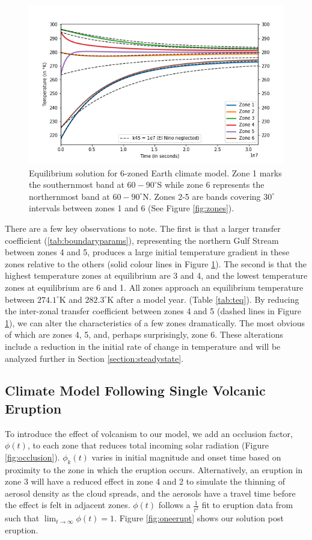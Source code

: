 \documentclass[12pt]{article}
\begin{document}
\begin{figure}[H]
    \centering
    \includegraphics[scale=0.5]{Question2.png}
    \caption{
        Equilibrium solution for 6-zoned Earth climate model. Zone 1 marks the
        southernmost band at $60-90^{\circ}$S while zone 6 represents the
        northernmost band at $60-90^{\circ}$N. Zones 2-5 are bands covering
        $30^{\circ}$ intervals between zones 1 and 6
        (See Figure \ref{fig:zones}).
    }
    \label{fig:steadystate}
\end{figure}
\FloatBarrier

There are a few key observations to note. The first is that a larger transfer
coefficient (\ref{tab:boundaryparams}), representing the northern Gulf Stream
between zones 4 and 5, produces a large initial temperature gradient in these
zones relative to the others (solid colour lines in Figure
\ref{fig:steadystate}). The second is that the highest temperature zones at
equilibrium are 3 and 4, and the lowest temperature zones at equilibrium are 6
and 1. All zones approach an equilibrium temperature between $274.1^{\circ}$K
and $282.3^{\circ}$K after a model year. (Table \ref{tab:teq}). By reducing the
inter-zonal transfer coefficient between zones 4 and 5
(dashed lines in Figure \ref{fig:steadystate}), we can alter the characteristics
of a few zones dramatically. The most obvious of which are zones 4, 5, and,
perhaps surprisingly, zone 6. These alterations include a reduction in the
initial rate of change in temperature and will be analyzed further in Section
\ref{section:steadystate}.

\subsection{Climate Model Following Single Volcanic Eruption}
To introduce the effect of volcanism to our model, we add an occlusion factor,
$\phi(t)$, to each zone that reduces total incoming solar radiation
(Figure \ref{fig:occlusion}). $\phi_k(t)$ varies in initial magnitude and onset
time based on proximity to the zone in which the eruption occurs. Alternatively,
an eruption in zone 3 will have a reduced effect in zone 4 and 2 to simulate
the thinning of aerosol density as the cloud spreads, and the aerosols have a
travel time before the effect is felt in adjacent zones. $\phi(t)$ follows a
$\frac{1}{t^2}$ fit to eruption data from \cite{robock} such that
$\lim_{t\to\infty}\phi(t) = 1$.
Figure \ref{fig:oneerupt} shows our solution post eruption. 
\end{document}
